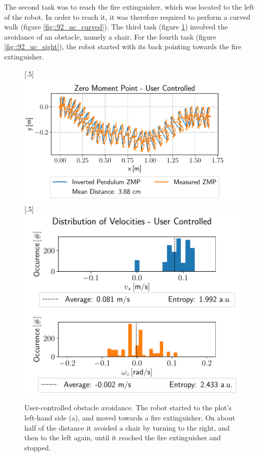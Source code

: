 The second task was to reach the fire extinguisher, which was located to the left of the robot. In order to reach it, it was therefore required to perform a curved walk (figure \ref{fig::92_uc_curved}). The third task (figure \ref{fig::92_uc_obstacle}) involved the avoidance of an obstacle, namely a chair. For the fourth task (figure \ref{fig::92_uc_sight}), the robot started with its back pointing towards the fire extinguisher.
\begin{figure}[h!]
	[.5\linewidth]{\includegraphics[scale=.45]{chapters/09_user_controlled_walking_experiments/img/02_test_environment/obstacle_walk_02_zmp.pdf}}
	[.5\linewidth]{\includegraphics[scale=.45]{chapters/09_user_controlled_walking_experiments/img/02_test_environment/obstacle_walk_02_entropy.pdf}}
	\caption{User-controlled obstacle avoidance. The robot started to the plot's left-hand side (a), and moved towards a fire extinguisher. On about half of the distance it avoided a chair by turning to the right, and then to the left again, until it reached the fire extinguisher and stopped.}
	\label{fig::92_uc_obstacle}
\end{figure} 
